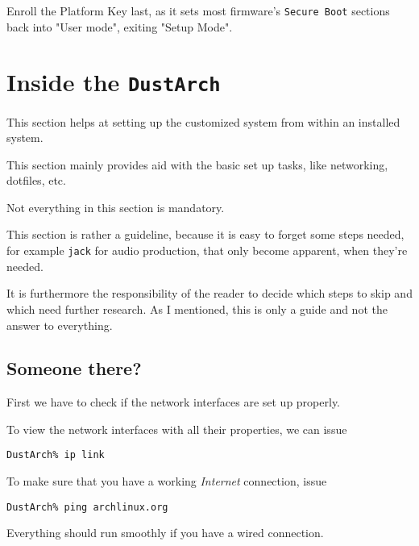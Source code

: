 \documentclass[9pt]{report}
\newenvironment{NOTE}
{\begin{tcolorbox}[colback=admonitionBG,coltitle=draculaFG,colframe=draculaBlue,colbacktitle=draculaBlue,title=NOTE]}
{\end{tcolorbox}}
\begin{document}
\begin{NOTE}
    Enroll the Platform Key last, as it sets most firmware’s \texttt{Secure Boot} sections back into "User mode", exiting "Setup Mode".

\end{NOTE}

\newpage

\hypertarget{x-inside-the-dustarch}{\chapter{Inside the \texttt{DustArch}}}
This section helps at setting up the customized system from within an installed system.


This section mainly provides aid with the basic set up tasks, like networking, dotfiles, etc.


\begin{NOTE}
    Not everything in this section is mandatory.


    This section is rather a guideline, because it is easy to forget some steps needed, for example \texttt{jack} for audio production, that only become apparent, when they’re needed.


    It is furthermore the responsibility of the reader to decide which steps to skip and which need further research.
    As I mentioned, this is only a guide and not the answer to everything.

\end{NOTE}

\newpage

\hypertarget{x-someone-there}{\section{Someone there?}}
First we have to check if the network interfaces are set up properly.


To view the network interfaces with all their properties, we can issue


\begin{verbatim}
DustArch% ip link
\end{verbatim}

To make sure that you have a working \emph{Internet} connection, issue


\begin{verbatim}
DustArch% ping archlinux.org
\end{verbatim}

Everything should run smoothly if you have a wired connection.
\end{document}
